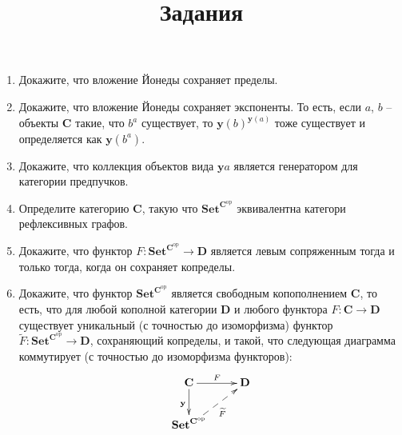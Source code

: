 \documentclass[draft]{article}
\newcommand{\cat}[1]{\mathbf{#1}}
\renewcommand{\C}{\cat{C}}
\newcommand{\D}{\cat{D}}
\newcommand{\y}{\cat{y}}
\newcommand{\Set}{\cat{Set}}
\newcommand{\fs}[1]{\mathrm{#1}}
\newcommand{\op}{\fs{op}}
\begin{document}
\title{Задания}
\maketitle

\begin{enumerate}

\item Докажите, что вложение Йонеды сохраняет пределы.

\item Докажите, что вложение Йонеды сохраняет экспоненты. То есть, если $a$, $b$ -- объекты $\C$ такие, что $b^a$ существует,
то $\y(b)^{\y(a)}$ тоже существует и определяется как $\y(b^a)$.

\item Докажите, что коллекция объектов вида $\y a$ является генератором для категории предпучков.

\item Определите категорию $\C$, такую что $\Set^{\C^\op}$ эквивалентна категори рефлексивных графов.

\item Докажите, что функтор $F : \Set^{\C^\op} \to \D$ является левым сопряженным тогда и только тогда, когда он сохраняет копределы.

\item Докажите, что функтор $\Set^{\C^\op}$ является свободным копополнением $\C$, то есть, что для любой кополной категории $\D$ и любого функтора $F : \C \to \D$
существует уникальный (с точностью до изоморфизма) функтор $\widetilde{F} : \Set^{\C^\op} \to \D$, сохраняющий копределы, и такой, что следующая диаграмма коммутирует (с точностью до изоморфизма функторов):
\[ \xymatrix{ \C \ar[r]^F \ar[d]_{\cat{y}}                 & \D \\
              \Set^{\C^\op} \ar@{-->}[ur]_{\widetilde{F}}
            } \]

\end{enumerate}
\end{document}

